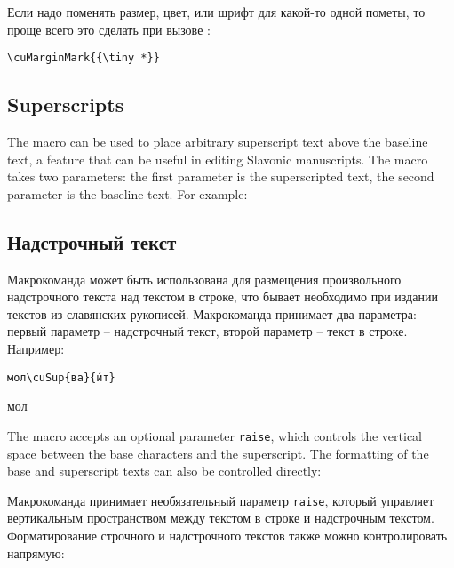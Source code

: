 \begin{RU}
Если надо поменять размер, цвет, или шрифт для какой-то одной пометы, то проще всего это сделать при
вызове :
\end{RU}

\begin{verbatim}
\cuMarginMark{{\tiny *}}
\end{verbatim}

\begin{EN}
\subsection{Superscripts}
The  macro can be used to place arbitrary superscript text above the
baseline text, a feature that can be useful in editing Slavonic manuscripts.
The macro takes two parameters: the first parameter is the superscripted text,
the second parameter is the baseline text. For example:
\end{EN}

\begin{RU}
\subsection{Надстрочный текст}
Макрокоманда  может быть использована для размещения произвольного
надстрочного текста над текстом в строке, что бывает необходимо при издании текстов
из славянских рукописей. Макрокоманда принимает два параметра: первый параметр -- 
надстрочный текст, второй параметр -- текст в строке. Например:
\end{RU}

\begin{verbatim}
мол\cuSup{ва}{и́т}
\end{verbatim}

\begin{churchslavonic}
мол
\end{churchslavonic}

\begin{EN}
The macro accepts an optional parameter \verb+raise+, which controls the vertical
space between the base characters and the superscript. The formatting of the
base and superscript texts can also be controlled directly:
\end{EN}

\begin{RU}
Макрокоманда принимает необязательный параметр \verb+raise+, который управляет
вертикальным пространством между текстом в строке и надстрочным текстом.
Форматирование строчного и надстрочного текстов также можно контролировать напрямую:
\end{RU}

